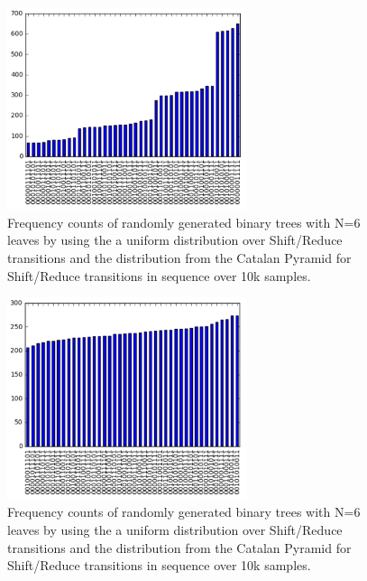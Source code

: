 \documentclass[11pt,a4paper]{article}
\begin{document}
\begin{figure}[h]
\centering
\includegraphics[width=7cm]{distribution_step}
\caption{Frequency counts of randomly generated binary trees with N=6 leaves by using the a uniform distribution over Shift/Reduce transitions and the distribution from the Catalan Pyramid for Shift/Reduce transitions in sequence over 10k samples.}
\label{fig:uniform}
\end{figure}

\begin{figure}[h]
\centering
\includegraphics[width=7cm]{distribution_balanced}
\caption{Frequency counts of randomly generated binary trees with N=6 leaves by using the a uniform distribution over Shift/Reduce transitions and the distribution from the Catalan Pyramid for Shift/Reduce transitions in sequence over 10k samples.}
\label{fig:catalan}
\end{figure}
\end{document}
